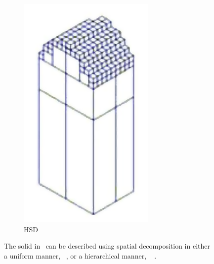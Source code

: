\begin{description}
\begin{figure}[H]
\begin{subfigure}[b]{0.2\textwidth}
			\includegraphics[width=\textwidth]{images/spatial_decomposition_hsd}
			\caption{HSD}
			\label{fig:spatial_decomposition_hsd}
		\end{subfigure}
		\caption[USD and HSD]{
			The solid in~ can be described using spatial decomposition in either a uniform manner, \cf~, or a hierarchical manner, \cf~ \cite{virtual_machining_review}.
		}
		\label{fig:spatial_decomposition}
	\end{figure}



\end{description}
